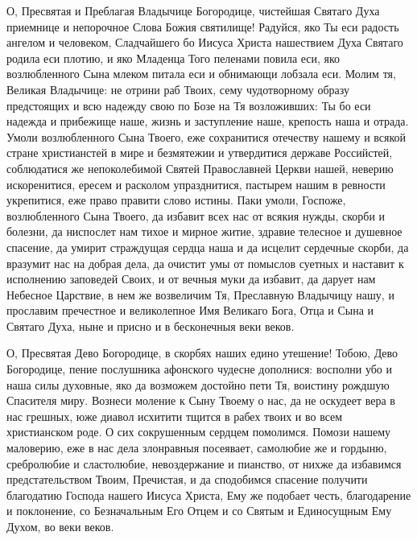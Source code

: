 \begin{mymulticols}

О, Пресвятая и Преблагая Владычице Богородице, чистейшая Святаго Духа приемнице и непорочное Слова Божия святилище! Радуйся, яко Ты еси радость ангелом и человеком, Сладчайшего бо Иисуса Христа нашествием Духа Святаго родила еси плотию, и яко Младенца Того пеленами повила еси, яко возлюбленного Сына млеком питала еси и обнимающи лобзала еси. Молим тя, Великая Владычице: не отрини раб Твоих, сему чудотворному образу предстоящих и всю надежду свою по Бозе на Тя возложивших: Ты бо еси надежда и прибежище наше, жизнь и заступление наше, крепость наша и отрада. Умоли возлюбленного Сына Твоего, еже сохранитися отечеству нашему и всякой стране христианстей в мире и безмятежии и утвердитися державе Российстей, соблюдатися же непоколебимой Святей Православней Церкви нашей, неверию искоренитися, ересем и расколом упразднитися, пастырем нашим в ревности укрепитися, еже право правити слово истины. Паки умоли, Госпоже, возлюбленного Сына Твоего, да избавит всех нас от всякия нужды, скорби и болезни, да ниспослет нам тихое и мирное житие, здравие телесное и душевное спасение, да умирит страждущая сердца наша и да исцелит сердечные скорби, да вразумит нас на добрая дела, да очистит умы от помыслов суетных и наставит к исполнению заповедей Своих, и от вечныя муки да избавит, да дарует нам Небесное Царствие, в нем же возвеличим Тя, Преславную Владычицу нашу, и прославим пречестное и великолепное Имя Великаго Бога, Отца и Сына и Святаго Духа, ныне и присно и в бесконечныя веки веков.

\end{mymulticols}

\mychapterending

\begin{mymulticols}


О, Пресвятая Дево Богородице, в скорбях наших едино утешение! Тобою, Дево Богородице, пение послушника афонского чудесне дополнися: восполни убо и наша силы духовные, яко да возможем достойно пети Тя, воистину рождшую Спасителя миру. Вознеси моление к Сыну Твоему о нас, да не оскудеет вера в нас грешных, юже диавол исхитити тщится в рабех твоих и во всем христианском роде. О сих сокрушенным сердцем помолимся. Помози нашему маловерию, еже в нас дела злонравныя посеявает, самолюбие же и гордыню, сребролюбие и сластолюбие, невоздержание и пианство, от нихже да избавимся предстательством Твоим, Пречистая, и да сподобимся спасение получити благодатию Господа нашего Иисуса Христа, Ему же подобает честь, благодарение и поклонение, со Безначальным Его Отцем и со Святым и Единосущным Ему Духом, во веки веков.

\end{mymulticols}

